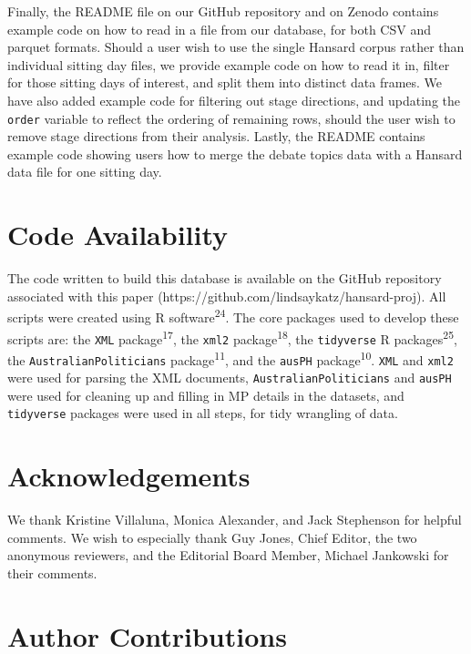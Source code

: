 \documentclass[
  letterpaper,
  DIV=11,
  numbers=noendperiod]{scrartcl}
\begin{document}
Finally, the README file on our GitHub repository and on Zenodo contains
example code on how to read in a file from our database, for both CSV
and parquet formats. Should a user wish to use the single Hansard corpus
rather than individual sitting day files, we provide example code on how
to read it in, filter for those sitting days of interest, and split them
into distinct data frames. We have also added example code for filtering
out stage directions, and updating the \texttt{order} variable to
reflect the ordering of remaining rows, should the user wish to remove
stage directions from their analysis. Lastly, the README contains
example code showing users how to merge the debate topics data with a
Hansard data file for one sitting day.

\hypertarget{code-availability}{%
\section{Code Availability}\label{code-availability}}

The code written to build this database is available on the GitHub
repository associated with this paper
(https://github.com/lindsaykatz/hansard-proj). All scripts were created
using R software\textsuperscript{24}. The core packages used to develop
these scripts are: the \texttt{XML} package\textsuperscript{17}, the
\texttt{xml2} package\textsuperscript{18}, the \texttt{tidyverse} R
packages\textsuperscript{25}, the \texttt{AustralianPoliticians}
package\textsuperscript{11}, and the \texttt{ausPH}
package\textsuperscript{10}. \texttt{XML} and \texttt{xml2} were used
for parsing the XML documents, \texttt{AustralianPoliticians} and
\texttt{ausPH} were used for cleaning up and filling in MP details in
the datasets, and \texttt{tidyverse} packages were used in all steps,
for tidy wrangling of data.

\hypertarget{acknowledgements}{%
\section{Acknowledgements}\label{acknowledgements}}

We thank Kristine Villaluna, Monica Alexander, and Jack Stephenson for
helpful comments. We wish to especially thank Guy Jones, Chief Editor,
the two anonymous reviewers, and the Editorial Board Member, Michael
Jankowski for their comments.

\hypertarget{author-contributions}{%
\section{Author Contributions}\label{author-contributions}}
\end{document}
